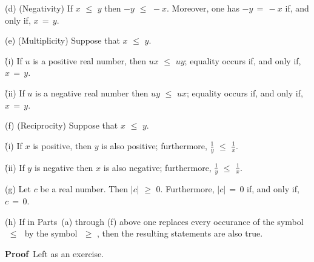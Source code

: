 {\V

        (d) (Negativity) If $x\,\,{\leq}\,\,y$ then $-y\,\,{\leq}\,\,-x$.
    Moreover, one has $-y \,=\, -x$ if, and only if, $x \,=\, y$.

\V

        (e) (Multiplicity) Suppose that $x\,\,{\leq}\,\,y$.

        \h (i) If $u$ is a positive real number, then $ux\,\,{\leq}\,\,uy$;  equality occurs if, and only if, $x \,=\, y$.

        \h (ii) If $u$ is a negative real number then $uy\,\,{\leq}\,\,ux$; equality occurs if, and only if, $x \,=\, y$.

\V

        (f) (Reciprocity) Suppose that $x\,\,{\leq}\,\,y$.

        \h (i) If $x$ is positive, then $y$ is also positive;
    furthermore,  ${\displaystyle \frac{1}{y}\,\,{\leq}\,\,\frac{1}{x}}$.

        \h (ii) If $y$ is negative then $x$ is also negative; furthermore, ${\displaystyle \frac{1}{y}\,\,{\leq}\,\,\frac{1}{x}}$.


\V
        (g) Let $c$ be a real number. Then $|c|\,\,{\geq}\,\,0$. Furthermore, $|c| \,=\, 0$ if, and only if, $c \,=\, 0$.

\V

        (h) If in Parts~(a) through (f) above one replaces every occurance of the symbol $\,\,{\leq}\,\,$ by the symbol $\,\,{\geq}\,\,$, then the resulting statements are also true.

\V

        {\bf Proof}\, Left as an exercise.
}%

\VV

